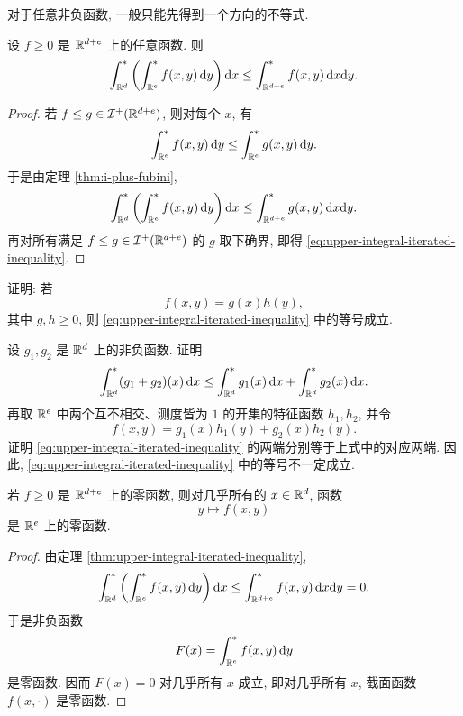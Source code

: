 对于任意非负函数, 一般只能先得到一个方向的不等式.

\begin{thm}\label{thm:upper-integral-iterated-inequality}
	设 \(f\geq0\) 是 \(\mathbb{R}^{d+e}\) 上的任意函数. 则
	\begin{equation}
		\int_{\mathbb{R}^d}^{*}\left(\int_{\mathbb{R}^e}^{*}f(x,y)\,\dd y\right)\dd x
		\leq
		\int_{\mathbb{R}^{d+e}}^{*}f(x,y)\,\dd x\dd y.
		\label{eq:upper-integral-iterated-inequality}
	\end{equation}
\end{thm}

\begin{proof}
	若 \(f\leq g\in\mathcal I^+(\mathbb{R}^{d+e})\), 则对每个 \(x\), 有
	\[
	\int_{\mathbb{R}^e}^{*}f(x,y)\,\dd y
	\leq
	\int_{\mathbb{R}^e}^{*}g(x,y)\,\dd y.
	\]
	于是由定理 \ref{thm:i-plus-fubini},
	\[
	\int_{\mathbb{R}^d}^{*}\left(\int_{\mathbb{R}^e}^{*}f(x,y)\,\dd y\right)\dd x
	\leq
	\int_{\mathbb{R}^{d+e}}^{*}g(x,y)\,\dd x\dd y.
	\]
	再对所有满足 \(f\leq g\in\mathcal I^+(\mathbb{R}^{d+e})\) 的 \(g\) 取下确界, 即得 \eqref{eq:upper-integral-iterated-inequality}.
\end{proof}

\begin{exer}\label{exer:product-equality-upper-integral}
	证明: 若
	\[
	f(x,y)=g(x)h(y),
	\]
	其中 \(g,h\geq0\), 则 \eqref{eq:upper-integral-iterated-inequality} 中的等号成立.
\end{exer}

\begin{exer}\label{exer:upper-integral-inequality-can-be-strict}
	设 \(g_1,g_2\) 是 \(\mathbb{R}^d\) 上的非负函数. 证明
	\[
	\int_{\mathbb{R}^d}^{*}(g_1+g_2)(x)\,\dd x
	\leq
	\int_{\mathbb{R}^d}^{*}g_1(x)\,\dd x+
	\int_{\mathbb{R}^d}^{*}g_2(x)\,\dd x.
	\]
	再取 \(\mathbb{R}^e\) 中两个互不相交、测度皆为 \(1\) 的开集的特征函数 \(h_1,h_2\), 并令
	\[
	f(x,y)=g_1(x)h_1(y)+g_2(x)h_2(y).
	\]
	证明 \eqref{eq:upper-integral-iterated-inequality} 的两端分别等于上式中的对应两端. 因此, \eqref{eq:upper-integral-iterated-inequality} 中的等号不一定成立.
\end{exer}

\begin{cor}\label{cor:null-function-sections}
	若 \(f\geq0\) 是 \(\mathbb{R}^{d+e}\) 上的零函数, 则对几乎所有的 \(x\in\mathbb{R}^d\), 函数
	\[
	y\longmapsto f(x,y)
	\]
	是 \(\mathbb{R}^e\) 上的零函数.
\end{cor}

\begin{proof}
	由定理 \ref{thm:upper-integral-iterated-inequality},
	\[
	\int_{\mathbb{R}^d}^{*}\left(\int_{\mathbb{R}^e}^{*}f(x,y)\,\dd y\right)\dd x
	\leq
	\int_{\mathbb{R}^{d+e}}^{*}f(x,y)\,\dd x\dd y=0.
	\]
	于是非负函数
	\[
	F(x)=\int_{\mathbb{R}^e}^{*}f(x,y)\,\dd y
	\]
	是零函数. 因而 \(F(x)=0\) 对几乎所有 \(x\) 成立, 即对几乎所有 \(x\), 截面函数 \(f(x,\cdot)\) 是零函数.
\end{proof}

